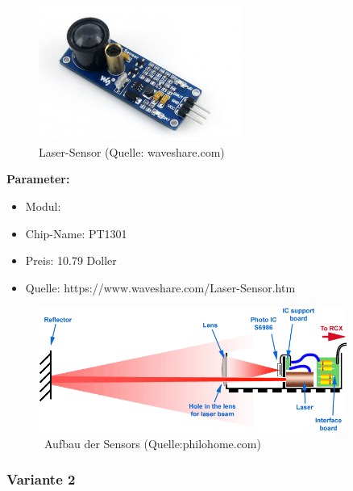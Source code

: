 \begin{figure}[!h]  %
	\centering\includegraphics[width=0.6\textwidth]{images/laser-sensor.png}
	\caption{Laser-Sensor (Quelle: waveshare.com)}
	\label{laser-sensor} %
\end{figure}

\textbf{Parameter:}  %
\begin{itemize}
\item Modul: 
\item Chip-Name: PT1301
\item Preis: 10.79 Doller
\item Quelle: https://www.waveshare.com/Laser-Sensor.htm
\end{itemize}
\begin{figure}[!h]  %
	\centering\includegraphics[width=0.9\textwidth]{images/laser-sensor1.png}
	\caption{ \ Aufbau der Sensors (Quelle:philohome.com)}
	\label{laser-sensor1} %
\end{figure}


\pagebreak
\subsubsection{Variante 2}



